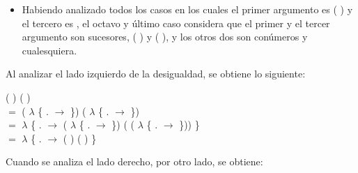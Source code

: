 \begin{AgdaAlign}
\begin{itemize}
\item Habiendo analizado todos los casos en los cuales el primer argumento es ( ) y el tercero es , el octavo y último caso considera que el primer y el tercer argumento son sucesores, ( ) y ( ), y los otros dos son conúmeros  y  cualesquiera.
\end{itemize}

Al analizar el lado izquierdo de la desigualdad, se obtiene lo siguiente:

 (  \AgdaFunction{+} ) (  \AgdaFunction{+} )\\
$=$  ( $\lambda$ \{ . $\rightarrow$   \AgdaFunction{+}  \}) ( $\lambda$ \{ . $\rightarrow$   \AgdaFunction{+}  \})\\
$=$  $\lambda$ \{ . $\rightarrow$  ( $\lambda$ \{ . $\rightarrow$   \AgdaFunction{+}  \}) ( ( $\lambda$ \{ . $\rightarrow$   \AgdaFunction{+}  \})) \} \\
$=$  $\lambda$ \{ . $\rightarrow$  (  \AgdaFunction{+} ) (  \AgdaFunction{+} ) \} 

Cuando se analiza el lado derecho, por otro lado, se obtiene:


\end{AgdaAlign}
